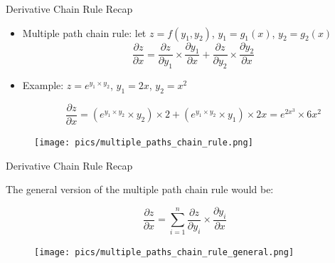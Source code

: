 \documentclass[handout]{beamer}
\begin{document}
\begin{frame}{Derivative Chain Rule Recap}
\begin{scriptsize}


\begin{itemize}
\item Multiple path chain rule: let $z = f(y_1,y_2)$, $y_1 = g_1(x)$, $y_2 =g_2(x)$ 
\begin{displaymath}
\frac{\partial z}{\partial x} = \frac{\partial z}{\partial y_1} \times \frac{\partial y_1}{\partial x} + \frac{\partial z}{\partial y_2} \times \frac{\partial y_2}{\partial x}
\end{displaymath}

\item  Example: $z= e^{y_1 \times y_2}$, $y_1 = 2x$, $y_2 = x^2$ 

\begin{displaymath}
\frac{\partial z}{\partial x} = (e^{y_1 \times y_2}\times y_2) \times 2 + (e^{y_1 \times y_2}\times y_1) \times 2x = e^{2x^3} \times 6x^2
\end{displaymath}


\end{itemize}


\begin{figure}[htb]
	\centering
	 \texttt{[image: pics/multiple\_paths\_chain\_rule.png]}
\end{figure}


\end{scriptsize}
\end{frame}



\begin{frame}{Derivative Chain Rule Recap}

The general version of the multiple path chain rule would be:

\begin{displaymath}
 \frac{\partial z}{\partial x} = \sum_{i=1}^n \frac{\partial z}{\partial y_i} \times \frac{\partial y_i}{\partial x} 
\end{displaymath}


\begin{figure}[htb]
	\centering
	 \texttt{[image: pics/multiple\_paths\_chain\_rule\_general.png]}
\end{figure}


\end{frame}
\end{document}
